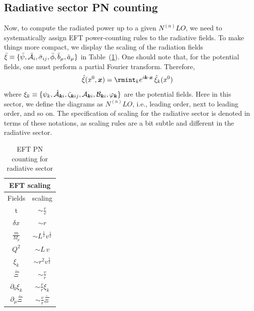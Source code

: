 \subsection{Radiative sector PN counting} \label{EFTcounting}
 Now, to compute the radiated power up to a given \textcolor{black}{$N^{(n)}LO$}, we need to systematically assign EFT power-counting rules to the radiative fields. To make things more compact, we display the scaling of the radiation fields $\bar{\xi}\equiv\{\bar\psi,\bar{{\mathcal{A}}}_i,\bar\sigma_{ij},\bar{\phi},\Bar{b}_{\mu}, \Bar{a}_{\mu}\}$ in Table~(\ref{table3mm}). One should note that, for the potential fields, one must perform a partial Fourier transform. Therefore,
$$\hat\xi(x^0,\boldsymbol{x})=\rmint_k e^{i\boldsymbol{k}\cdot \boldsymbol{x}}\,\hat\xi_k(x^0)$$
where $\xi_k\equiv \{\psi_k,\Hat{\mathcal{A}}_{{\boldsymbol{k}}i},\zeta_{{\boldsymbol{k}}ij}, \mathcal{A}_{\boldsymbol{k}i},\mathcal{B}_{\boldsymbol{k}i},\varphi_{\boldsymbol{k}}\}$ are the potential fields. Here in this sector, we define the diagrams as $N^{(n)}LO$, i.e., leading order, next to leading order, and so on. The specification of scaling for the radiative sector is denoted in terms of these notations, as scaling rules are a bit subtle and different in the radiative sector. 
\begin{table}[ht]
\begin{center}
\begin{tabular}{|c|c|}
    \hline
   \multicolumn{2}{|c|}{EFT scaling} \\
\hline
Fields & scaling\\
\hline
t &  $\sim\frac{r}{v}$\\
\hline
  $\delta x$ &$\sim r$\\
  \hline
  $\frac{m}{M_{p}}$ & $\sim L^\frac{1}{2}v^\frac{1}{2}$\\
  \hline
  $Q^2$ & $ \sim L\,v$\\
  \hline
  $\xi_k$ & $\sim r^2v^\frac{1}{2}$\\
  \hline
$\bar{\Xi}$  & $\sim\frac{v}{r}$\\
\hline
$\partial_0\xi_k$ & $\sim\frac{v}{r}\xi_k$\\
\hline
  $\partial_{\mu}\bar{\Xi}$ & $\sim\frac{v}{r}\bar{\Xi}$\\
  \hline 
\end{tabular}
\end{center}
\caption{EFT PN counting for radiative sector}
\label{table3mm}
\end{table} 
